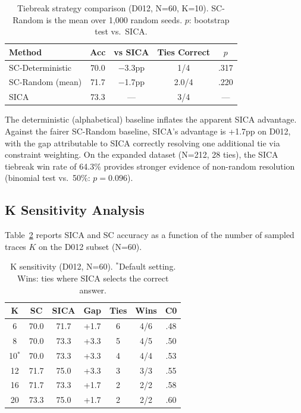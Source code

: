 \documentclass[11pt,a4paper]{article}
\begin{document}
\begin{table}[t]
\centering
\small
\begin{tabular}{lcccc}
\toprule
\textbf{Method} & \textbf{Acc} & \textbf{vs SICA} & \textbf{Ties Correct} & \textbf{$p$} \\
\midrule
SC-Deterministic & 70.0 & $-$3.3pp & 1/4 & .317 \\
SC-Random (mean) & 71.7 & $-$1.7pp & 2.0/4 & .220 \\
SICA             & 73.3 & --- & 3/4 & --- \\
\bottomrule
\end{tabular}
\caption{Tiebreak strategy comparison (D012, N=60, K=10). SC-Random is the mean over 1,000 random seeds. $p$: bootstrap test vs.\ SICA.}
\label{tab:tiebreak_baselines}
\end{table}

The deterministic (alphabetical) baseline inflates the apparent SICA advantage. Against the fairer SC-Random baseline, SICA's advantage is +1.7pp on D012, with the gap attributable to SICA correctly resolving one additional tie via constraint weighting. On the expanded dataset (N=212, 28 ties), the SICA tiebreak win rate of 64.3\% provides stronger evidence of non-random resolution (binomial test vs.\ 50\%: $p{=}0.096$).

\subsection{K Sensitivity Analysis}
\label{sec:k_ablation}

Table~\ref{tab:k_sensitivity} reports SICA and SC accuracy as a function of the number of sampled traces $K$ on the D012 subset (N=60).

\begin{table}[t]
\centering
\small
\begin{tabular}{ccccccc}
\toprule
\textbf{K} & \textbf{SC} & \textbf{SICA} & \textbf{Gap} & \textbf{Ties} & \textbf{Wins} & \textbf{C0} \\
\midrule
6      & 70.0 & 71.7 & +1.7 & 6 & 4/6 & .48 \\
8      & 70.0 & 73.3 & +3.3 & 5 & 4/5 & .50 \\
10$^*$ & 70.0 & 73.3 & +3.3 & 4 & 4/4 & .53 \\
12     & 71.7 & 75.0 & +3.3 & 3 & 3/3 & .55 \\
16     & 71.7 & 73.3 & +1.7 & 2 & 2/2 & .58 \\
20     & 73.3 & 75.0 & +1.7 & 2 & 2/2 & .60 \\
\bottomrule
\end{tabular}
\caption{K sensitivity (D012, N=60). $^*$Default setting. Wins: ties where SICA selects the correct answer.}
\label{tab:k_sensitivity}
\end{table}
\end{document}

